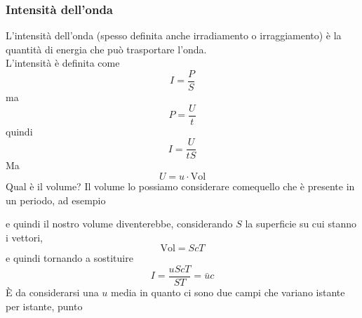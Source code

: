 \subsubsection{Intensità dell'onda}
L'intensità dell'onda (spesso definita anche irradiamento o irraggiamento) è la quantità di energia
che può trasportare l'onda.\\
L'intensità è definita come
\begin{equation*}
  I = \frac{P}{S}
\end{equation*}
ma
\begin{equation*}
  P = \frac{U}{t}
\end{equation*}
quindi
\begin{equation*}
  I = \frac{U}{tS}
\end{equation*}
Ma
\begin{equation*}
  U = u\cdot\text{Vol}
\end{equation*}
Qual è il volume? Il volume lo possiamo considerare comequello che è presente in un periodo, ad
esempio
\begin{center}
\end{center}
e quindi il nostro volume diventerebbe, considerando $S$ la superficie su cui stanno i vettori,
\begin{equation*}
  \text{Vol} = ScT
\end{equation*}
e quindi tornando a sostituire
\begin{equation*}
  I = \frac{uScT}{ST} = \bar{u}c
\end{equation*}
È da considerarsi una $u$ media in quanto ci sono due campi che variano istante per istante, punto
